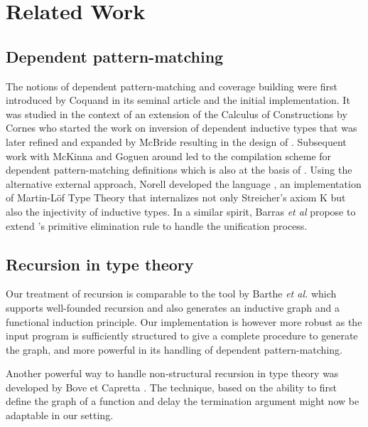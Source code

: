 \section{Related Work}
\label{sec:related-work}

\subsection{Dependent pattern-matching}
The notions of dependent pattern-matching and coverage building were
first introduced by Coquand in its seminal article
\cite{coquand92baastad} and the initial  implementation.
It was studied in the context of an extension of the Calculus of
Constructions by Cornes \cite{CornesPhD} who
started the work on
inversion of dependent inductive types that was later refined and
expanded by McBride resulting in the design of 
\cite{mcbride00dependently}. Subsequent work with McKinna and Goguen
around \Epigram
\cite{mcbride:concon,DBLP:journals/jfp/McBrideM04,DBLP:conf/birthday/GoguenMM06}
led to the compilation scheme for dependent pattern-matching definitions
which is also at the basis of \Equations. Using the alternative external approach,
Norell developed the  language \cite{norell:thesis}, an
implementation of Martin-Löf Type Theory that internalizes not only
Streicher's axiom K but also the injectivity of inductive types.
In a similar spirit, Barras {\it et al} \cite{conf/types/BarrasCGHS08}
propose to extend \Coq's primitive elimination rule to handle the
unification process.

\subsection{Recursion in type theory}

Our treatment of recursion is comparable to the  tool by
Barthe {\it et al.} \cite{Barthe:2006gp} which supports well-founded
recursion and also generates an inductive graph and a functional
induction principle. Our implementation is however more robust as the
input program is sufficiently structured to give a complete procedure to
generate the graph, and more powerful in its handling of dependent
pattern-matching. 

Another powerful way to handle non-structural recursion in type theory
was developed by Bove et Capretta \cite{journals/mscs/BoveC05}. The
technique, based on the ability to first define the graph of a function
and delay the termination argument might now be adaptable in our
setting.

